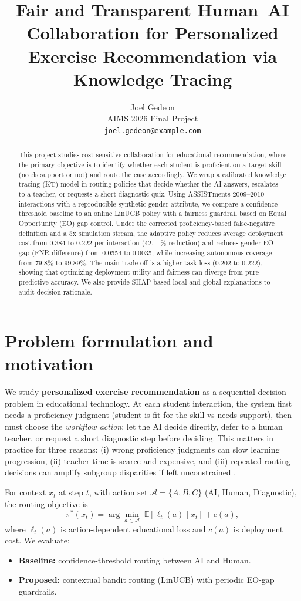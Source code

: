 \documentclass{article}
\title{Fair and Transparent Human--AI Collaboration for Personalized Exercise Recommendation via Knowledge Tracing}
\author{
  Joel Gedeon \\
  AIMS 2026 Final Project \\
  \texttt{joel.gedeon@example.com}
}
\begin{document}
\maketitle

\begin{abstract}
This project studies cost-sensitive collaboration for educational recommendation, where the primary objective is to identify whether each student is proficient on a target skill (needs support or not) and route the case accordingly. We wrap a calibrated knowledge tracing (KT) model in routing policies that decide whether the AI answers, escalates to a teacher, or requests a short diagnostic quiz. Using ASSISTments 2009--2010 interactions with a reproducible synthetic gender attribute, we compare a confidence-threshold baseline to an online LinUCB policy with a fairness guardrail based on Equal Opportunity (EO) gap control. Under the corrected proficiency-based false-negative definition and a 5x simulation stream, the adaptive policy reduces average deployment cost from 0.384 to 0.222 per interaction (\SI{42.1}{\percent} reduction) and reduces gender EO gap (FNR difference) from 0.0554 to 0.0035, while increasing autonomous coverage from 79.8\% to 99.89\%. The main trade-off is a higher task loss (0.202 to 0.222), showing that optimizing deployment utility and fairness can diverge from pure predictive accuracy. We also provide SHAP-based local and global explanations to audit decision rationale.
\end{abstract}

\section{Problem formulation and motivation}
We study \textbf{personalized exercise recommendation} as a sequential decision problem in educational technology. At each student interaction, the system first needs a proficiency judgment (student is fit for the skill vs needs support), then must choose the \emph{workflow action}: let the AI decide directly, defer to a human teacher, or request a short diagnostic step before deciding. This matters in practice for three reasons: (i) wrong proficiency judgments can slow learning progression, (ii) teacher time is scarce and expensive, and (iii) repeated routing decisions can amplify subgroup disparities if left unconstrained \citep{friedman1996bias,khan2022substantive}.

For context $x_t$ at step $t$, with action set $\mathcal{A}=\{A,B,C\}$ (AI, Human, Diagnostic), the routing objective is
\[
\pi^{*}(x_t)=\arg\min_{a\in\mathcal{A}} \; \mathbb{E}\!\left[\ell_t(a)\mid x_t\right] + c(a),
\]
where \(\ell_t(a)\) is action-dependent educational loss and \(c(a)\) is deployment cost.
We evaluate:
\begin{itemize}
\item \textbf{Baseline:} confidence-threshold routing between AI and Human.
\item \textbf{Proposed:} contextual bandit routing (LinUCB) with periodic EO-gap guardrails.
\end{itemize}
\end{document}
